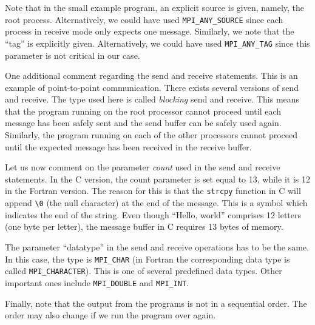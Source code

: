 Note that in the small example program, an explicit source is given, namely, the
root process. Alternatively, we could have used \texttt{MPI\_ANY\_SOURCE} since
each process in receive mode only expects one message. Similarly, we note that
the ``tag'' is explicitly given. Alternatively, we could have used
\texttt{MPI\_ANY\_TAG} since this parameter is not critical in our case.

One additional comment regarding the send and receive statements. This is an
example of point-to-point communication. There exists several versions of send
and receive. The type used here is called \emph{blocking} send and receive. This
means that the program running on the root processor cannot proceed until each
message has been safely sent and the send buffer can be safely used again.
Similarly, the program running on each of the other processors cannot proceed
until the expected message has been received in the receive buffer.

Let us now comment on the parameter \emph{count} used in the send and receive
statements. In the C version, the count parameter is set equal to 13, while it
is 12 in the Fortran version. The reason for this is that the \texttt{strcpy}
function in C will append \texttt{\textbackslash 0} (the null character) at the
end of the message. This is a symbol which indicates the end of the string. Even
though ``Hello, world'' comprises 12 letters (one byte per letter), the message
buffer in C requires 13 bytes of memory.

The parameter ``datatype'' in the send and receive operations has to be the same.
In this case, the type is \texttt{MPI\_CHAR} (in Fortran the corresponding data
type is called \texttt{MPI\_CHARACTER}). This is one of several predefined data
types. Other important ones include \texttt{MPI\_DOUBLE} and \texttt{MPI\_INT}.

Finally, note that the output from the programs is not in a sequential order.
The order may also change if we run the program over again.
